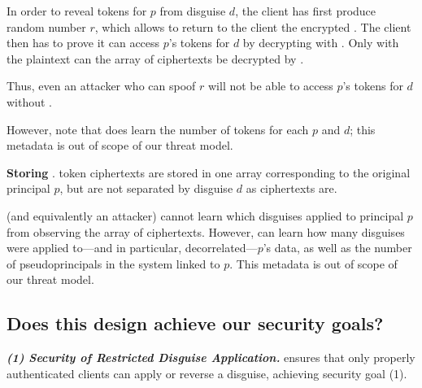 In order to reveal tokens for $p$ from disguise $d$, the client has first produce random number $r$,
which allows \sys to return to the client the encrypted . The client then has to prove it
can access $p$'s tokens for $d$ by decrypting  with .  Only with the plaintext
 can the array of  ciphertexts be decrypted by \sys.

Thus, even an attacker who can spoof $r$ will not be able to access $p$'s tokens for $d$ without
.

However, note that \sys does learn the number of  tokens for each $p$ and $d$; this
metadata is out of scope of our threat model.

\vspace{6pt}\noindent\textbf{Storing }.
 token ciphertexts are stored in one array corresponding to the original principal $p$, but are not
separated by disguise $d$ as  ciphertexts are.

\sys (and equivalently an attacker) cannot learn which disguises applied to
principal $p$ from observing the array of  ciphertexts. However, \sys can learn how many
disguises were applied to---and in particular, decorrelated---$p$'s data, as well as the number of
pseudoprincipals in the system linked to $p$. This metadata is out of scope of our threat model.




\subsection{Does this design achieve our security goals?}
\label{sec:achievegoals}
\vspace{6pt}\noindent\textbf{\emph{(1) Security of Restricted Disguise Application.}}
\sys ensures that only properly authenticated clients can apply or
reverse a disguise, achieving security goal (1).

